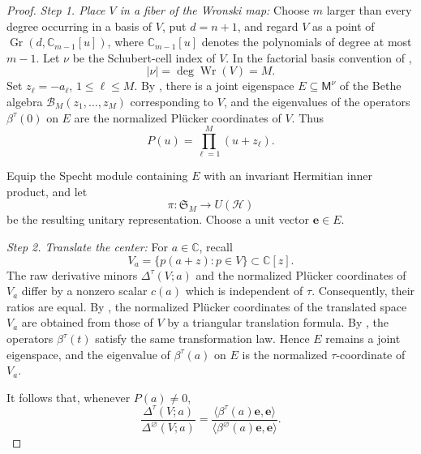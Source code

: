 \documentclass[12pt,letterpaper,reqno]{amsart}
\theoremstyle{definition}
\numberwithin{equation}{section}
\newcommand{\C}{\mathbb C}
\newcommand{\ev}{\bm  e}
\begin{document}
\begin{proof}

\medskip\noindent
\emph{{Step 1. Place \(V\) in a fiber of the Wronski map:}}
Choose \(m\) larger than every degree occurring in a basis of \(V\),
put \(d=n+1\), and regard \(V\) as a point of
\(\operatorname{Gr}(d,\mathbb C_{m-1}[u])\), where
\(\mathbb C_{m-1}[u]\) denotes the polynomials of degree at most
\(m-1\). Let \(\nu\) be the Schubert-cell index of \(V\). In the
factorial basis convention of \cite{KP26},
\[
|\nu|=\deg\operatorname{Wr}(V)=M.
\]
Set \(z_\ell=-a_\ell\), \(1\leq\ell\leq M\). By
\cite[Theorem~1.3(v)]{KP26}, there is a joint eigenspace
\(E\subseteq\mathsf M^\nu\) of the Bethe algebra
\(\mathcal B_M(z_1,\ldots,z_M)\) corresponding to \(V\), and the
eigenvalues of the operators \(\beta^\tau(0)\) on \(E\) are the
normalized Pl\"ucker coordinates of \(V\). Thus
\[
P(u)=\prod_{\ell=1}^M(u+z_\ell).
\]

Equip the Specht module containing \(E\) with an invariant Hermitian
inner product, and let
\[
\pi:\mathfrak S_M\longrightarrow U(\mathcal H)
\]
be the resulting unitary representation. Choose a unit vector
$
\ev\in E.
$

\medskip\noindent
\emph{{Step 2. Translate the center:}}
For \(a\in\C\), recall
\[
V_a=\{p(a+z):p\in V\}\subset\C[z].
\]
The raw derivative minors \(\Delta^\tau(V;a)\) and the normalized
Pl\"ucker coordinates of \(V_a\) differ by a nonzero scalar \(c(a)\)
which is independent of \(\tau\). Consequently, their ratios are
equal. By \cite[Proposition~2.9]{KP26}, the normalized Pl\"ucker
coordinates of the translated space \(V_a\) are obtained from those of
\(V\) by a triangular translation formula. By
\cite[Theorem~1.3(ii)]{KP26}, the operators \(\beta^\tau(t)\) satisfy
the same transformation law. Hence \(E\) remains a joint eigenspace,
and the eigenvalue of \(\beta^\tau(a)\) on \(E\) is the normalized
\(\tau\)-coordinate of \(V_a\).

It follows that, whenever \(P(a)\ne0\),
\begin{equation}\label{eq:minor-beta-ratio}
 \frac{\Delta^\tau(V;a)}
      {\Delta^\varnothing(V;a)}
 =
 \frac{\langle\beta^\tau(a)\ev,\ev\rangle}
      {\langle\beta^\varnothing(a)\ev,\ev\rangle}.
\end{equation}


\end{proof}
\end{document}
